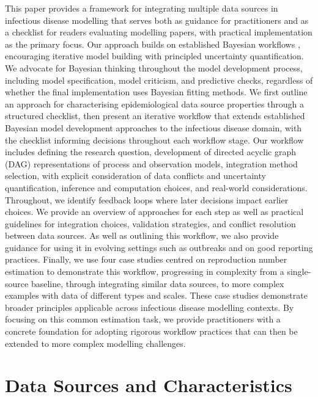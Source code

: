 \documentclass{article}
\begin{document}
This paper provides a framework for integrating multiple data sources in infectious disease modelling that serves both as guidance for practitioners and as a checklist for readers evaluating modelling papers, with practical implementation as the primary focus. 
Our approach builds on established Bayesian workflows \citep{gelman2020bayesian}, encouraging iterative model building with principled uncertainty quantification. We advocate for Bayesian thinking throughout the model development process, including model specification, model criticism, and predictive checks, regardless of whether the final implementation uses Bayesian fitting methods. 
We first outline an approach for characterising epidemiological data source properties through a structured checklist, then present an iterative workflow that extends established Bayesian model development approaches to the infectious disease domain, with the checklist informing decisions throughout each workflow stage. 
Our workflow includes defining the research question, development of directed acyclic graph (DAG) representations of process and observation models, integration method selection, with explicit consideration of data conflicts and uncertainty quantification, inference and computation choices, and real-world considerations. Throughout, we identify feedback loops where later decisions impact earlier choices. 
We provide an overview of approaches for each step as well as practical guidelines for integration choices, validation strategies, and conflict resolution between data sources. 
As well as outlining this workflow, we also provide guidance for using it in evolving settings such as outbreaks and on good reporting practices.
Finally, we use four case studies centred on reproduction number estimation to demonstrate this workflow, progressing in complexity from a single-source baseline, through integrating similar data sources, to more complex examples with data of different types and scales. 
These case studies demonstrate broader principles applicable across infectious disease modelling contexts. 
By focusing on this common estimation task, we provide practitioners with a concrete foundation for adopting rigorous workflow practices that can then be extended to more complex modelling challenges.

\section{Data Sources and Characteristics} \label{sec:datareview}
\end{document}
